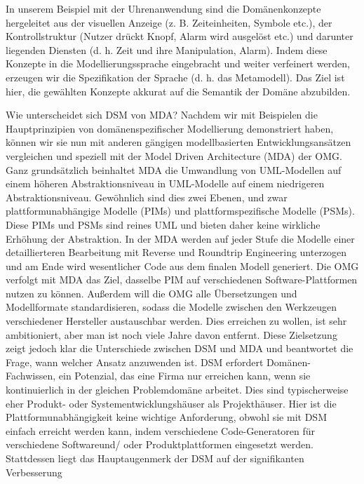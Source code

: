 \documentclass[11pt,english,ngerman, headsepline]{scrreprt}
\begin{document}
 
 In unserem Beispiel mit der Uhrenanwendung sind die
Domänenkonzepte hergeleitet aus der visuellen Anzeige (z.
B. Zeiteinheiten, Symbole etc.), der Kontrollstruktur (Nutzer
drückt Knopf, Alarm wird ausgelöst etc.) und darunter liegenden
Diensten (d. h. Zeit und ihre Manipulation, Alarm). Indem
diese Konzepte in die Modellierungssprache eingebracht und
weiter verfeinert werden, erzeugen wir die Spezifikation der
Sprache (d. h. das Metamodell). Das Ziel ist hier, die gewählten
Konzepte akkurat auf die Semantik der Domäne abzubilden. \cite{dsmUhrenArtikel}
 
 
  
Wie unterscheidet sich DSM von MDA?
Nachdem wir mit Beispielen die Hauptprinzipien von domänenspezifischer
Modellierung demonstriert haben, können wir
sie nun mit anderen gängigen modellbasierten Entwicklungsansätzen
vergleichen und speziell mit der Model Driven Architecture
(MDA) der OMG. Ganz grundsätzlich beinhaltet MDA
die Umwandlung von UML-Modellen auf einem höheren Abstraktionsniveau
in UML-Modelle auf einem niedrigeren Abstraktionsniveau.
Gewöhnlich sind dies zwei Ebenen, und zwar
plattformunabhängige Modelle (PIMs) und plattformspezifische
Modelle (PSMs). Diese PIMs und PSMs sind reines UML
und bieten daher keine wirkliche Erhöhung der Abstraktion.
In der MDA werden auf jeder Stufe die Modelle einer detaillierteren
Bearbeitung mit Reverse und Roundtrip Engineering
unterzogen und am Ende wird wesentlicher Code aus dem finalen
Modell generiert. Die OMG verfolgt mit MDA das Ziel,
dasselbe PIM auf verschiedenen Software-Plattformen nutzen
zu können. Außerdem will die OMG alle Übersetzungen und
Modellformate standardisieren, sodass die Modelle zwischen
den Werkzeugen verschiedener Hersteller austauschbar werden.
Dies erreichen zu wollen, ist sehr ambitioniert, aber man
ist noch viele Jahre davon entfernt. Diese Zielsetzung zeigt jedoch
klar die Unterschiede zwischen DSM und MDA und beantwortet
die Frage, wann welcher Ansatz anzuwenden ist.
DSM erfordert Domänen-Fachwissen, ein Potenzial, das eine
Firma nur erreichen kann, wenn sie kontinuierlich in der gleichen
Problemdomäne arbeitet. Dies sind typischerweise eher
Produkt- oder Systementwicklungshäuser als Projekthäuser.
Hier ist die Plattformunabhängigkeit keine wichtige Anforderung, obwohl sie mit DSM einfach erreicht werden kann, indem
verschiedene Code-Generatoren für verschiedene Softwareund/
oder Produktplattformen eingesetzt werden. Stattdessen
liegt das Hauptaugenmerk der DSM auf der signifikanten Verbesserung
\end{document}
